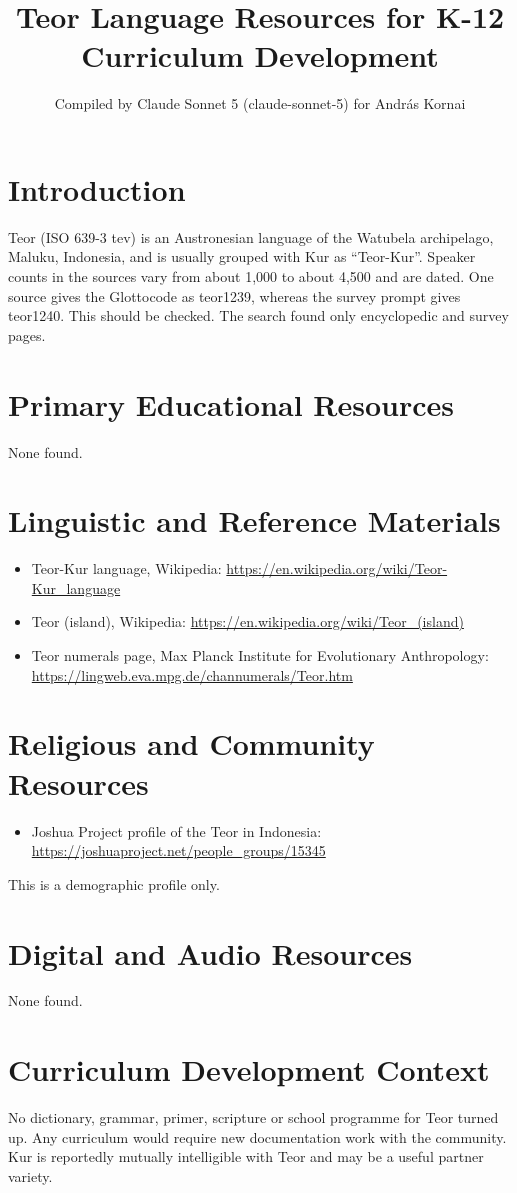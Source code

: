 \documentclass[12pt]{article}
\title{Teor Language Resources for K-12 Curriculum Development}
\author{Compiled by Claude Sonnet 5 (claude-sonnet-5) for Andr\'as Kornai}
\date{}
\begin{document}
\maketitle

\section{Introduction}
Teor (ISO 639-3 tev) is an Austronesian language of the Watubela archipelago, Maluku, Indonesia, and is usually grouped with Kur as ``Teor-Kur''. Speaker counts in the sources vary from about 1,000 to about 4,500 and are dated. One source gives the Glottocode as teor1239, whereas the survey prompt gives teor1240. This should be checked. The search found only encyclopedic and survey pages.

\section{Primary Educational Resources}
None found.

\section{Linguistic and Reference Materials}
\begin{itemize}
\item Teor-Kur language, Wikipedia: \url{https://en.wikipedia.org/wiki/Teor-Kur_language}
\item Teor (island), Wikipedia: \url{https://en.wikipedia.org/wiki/Teor_(island)}
\item Teor numerals page, Max Planck Institute for Evolutionary Anthropology: \url{https://lingweb.eva.mpg.de/channumerals/Teor.htm}
\end{itemize}

\section{Religious and Community Resources}
\begin{itemize}
\item Joshua Project profile of the Teor in Indonesia: \url{https://joshuaproject.net/people_groups/15345}
\end{itemize}
This is a demographic profile only.

\section{Digital and Audio Resources}
None found.

\section{Curriculum Development Context}
No dictionary, grammar, primer, scripture or school programme for Teor turned up. Any curriculum would require new documentation work with the community. Kur is reportedly mutually intelligible with Teor and may be a useful partner variety.
\end{document}
